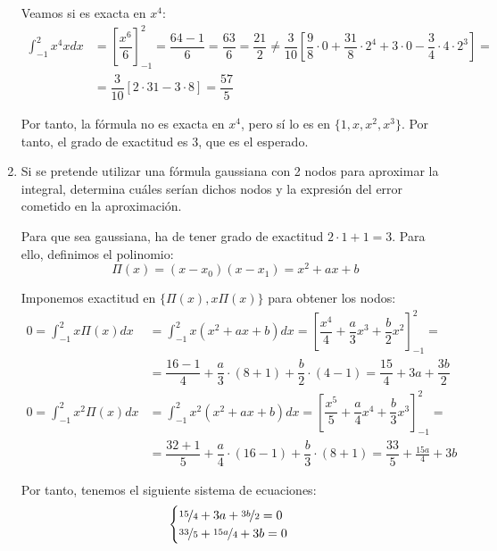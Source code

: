 \begin{ejercicio}
\begin{enumerate}
        Veamos si es exacta en $x^4$:
        \begin{align*}
            \int_{-1}^{2} x^4 x dx &= \left[\dfrac{x^6}{6}\right]_{-1}^{2} = \dfrac{64-1}{6} = \dfrac{63}{6} = \dfrac{21}{2}\neq \dfrac{3}{10}\left[\dfrac{9}{8}\cdot 0 + \dfrac{31}{8}\cdot 2^4 + 3\cdot 0 - \dfrac{3}{4}\cdot 4\cdot 2^3\right] =\\&= \dfrac{3}{10}\left[2\cdot 31 - 3\cdot 8\right] = \dfrac{57}{5}
        \end{align*}

        Por tanto, la fórmula no es exacta en $x^4$, pero sí lo es en $\{1, x, x^2, x^3\}$. Por tanto, el grado de exactitud es $3$, que es el esperado.
        \item Si se pretende utilizar una fórmula gaussiana con 2 nodos para aproximar la integral, determina cuáles serían dichos nodos y la expresión del error cometido en la aproximación.
        
        Para que sea gaussiana, ha de tener grado de exactitud $2\cdot 1 + 1 = 3$. Para ello, definimos el polinomio:
        \begin{equation*}
            \Pi(x) = (x-x_0)(x-x_1) = x^2 + ax + b
        \end{equation*}

        Imponemos exactitud en $\{\Pi(x), x\Pi(x)\}$ para obtener los nodos:
        \begin{align*}
            0 = \int_{-1}^{2} x\Pi(x)dx &= \int_{-1}^{2} x(x^2 + ax + b)dx = \left[\dfrac{x^4}{4} + \dfrac{a}{3}x^3 + \dfrac{b}{2}x^2\right]_{-1}^{2} =\\&= \dfrac{16-1}{4} + \dfrac{a}{3}\cdot (8+1) + \dfrac{b}{2}\cdot (4-1)
            = \dfrac{15}{4} + 3a + \dfrac{3b}{2}\\
            0 = \int_{-1}^{2} x^2\Pi(x)dx &= \int_{-1}^{2} x^2(x^2 + ax + b)dx = \left[\dfrac{x^5}{5} + \dfrac{a}{4}x^4 + \dfrac{b}{3}x^3\right]_{-1}^{2} =\\&= \dfrac{32+1}{5} + \dfrac{a}{4}\cdot (16-1) + \dfrac{b}{3}\cdot (8+1)
            = \dfrac{33}{5} + \frac{15a}{4} + 3b
        \end{align*}

        Por tanto, tenemos el siguiente sistema de ecuaciones:
        \begin{equation*}
            \begin{cases}
                \nicefrac{15}{4} + 3a + \nicefrac{3b}{2} = 0\\
                \nicefrac{33}{5} + \nicefrac{15a}{4} + 3b = 0
            \end{cases}
        \end{equation*}


\end{enumerate}
\end{ejercicio}
